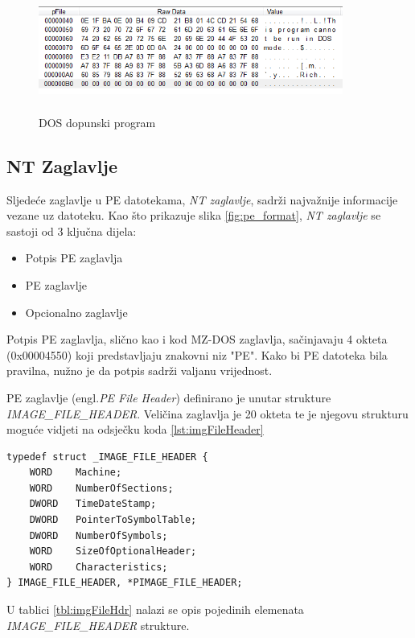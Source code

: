 \documentclass[times, utf8, diplomski, numeric]{fer}
\begin{document}
\begin{figure}[!ht]
\centering
\setlength\fboxsep{0pt}
\setlength\fboxrule{0.5pt}
\includegraphics[width=10cm, height=4cm]{slike/dos_stub}
\caption{DOS dopunski program}
\label{fig:dos_stub} 
\end{figure}

\subsection{NT Zaglavlje}
Sljedeće zaglavlje u PE datotekama, \emph{NT zaglavlje}, sadrži najvažnije informacije vezane uz datoteku. Kao što prikazuje slika \ref{fig:pe_format}, \emph{NT zaglavlje} se sastoji od 3 ključna dijela:
\begin{itemize}
\item Potpis PE zaglavlja
\item PE zaglavlje
\item Opcionalno zaglavlje
\end{itemize} 
Potpis PE zaglavlja, slično kao i kod MZ-DOS zaglavlja, sačinjavaju 4 okteta (0x00004550) koji predstavljaju znakovni niz "PE". Kako bi PE datoteka bila pravilna, nužno je da potpis sadrži valjanu vrijednost. 

PE zaglavlje (engl.\emph{PE File Header}) definirano je unutar strukture \emph{IMAGE\_FILE\_HEADER}. Veličina zaglavlja je 20 okteta te je njegovu strukturu moguće vidjeti na odsječku koda \ref{lst:imgFileHeader}

\begin{lstlisting}[frame=single, caption=IMAGE\_FILE\_HEADER struktura, label={lst:imgFileHeader}]
typedef struct _IMAGE_FILE_HEADER {
	WORD    Machine;
	WORD    NumberOfSections;
	DWORD   TimeDateStamp;
	DWORD   PointerToSymbolTable;
	DWORD   NumberOfSymbols;
	WORD    SizeOfOptionalHeader;
	WORD    Characteristics;
} IMAGE_FILE_HEADER, *PIMAGE_FILE_HEADER;
\end{lstlisting}
U tablici \ref{tbl:imgFileHdr} nalazi se opis pojedinih elemenata \emph{IMAGE\_FILE\_HEADER} strukture.
\pagebreak
\end{document}
